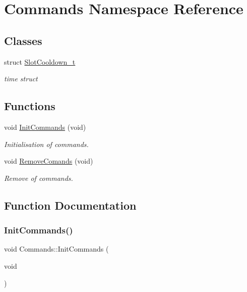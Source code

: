 \hypertarget{namespace_commands}{}\section{Commands Namespace Reference}
\label{namespace_commands}
\subsection*{Classes}
\begin{DoxyCompactItemize}
\item 
struct \mbox{\hyperlink{struct_commands_1_1_slot_cooldown__t}{Slot\+Cooldown\+\_\+t}}
\begin{DoxyCompactList}\small\item\em time struct \end{DoxyCompactList}\end{DoxyCompactItemize}
\subsection*{Functions}
\begin{DoxyCompactItemize}
\item 
void \mbox{\hyperlink{namespace_commands_a51cb85ec2c0f776aa53dcb6c8c2c7cd3}{Init\+Commands}} (void)
\begin{DoxyCompactList}\small\item\em Initialisation of commands. \end{DoxyCompactList}\item 
void \mbox{\hyperlink{namespace_commands_ae6511be8bafb608ff2b1861a98e3e4e6}{Remove\+Comands}} (void)
\begin{DoxyCompactList}\small\item\em Remove of commands. \end{DoxyCompactList}\end{DoxyCompactItemize}


\subsection{Function Documentation}
\mbox{\label{namespace_commands_a51cb85ec2c0f776aa53dcb6c8c2c7cd3}} 
\subsubsection{\texorpdfstring{Init\+Commands()}{InitCommands()}}
{\footnotesize\ttfamily void Commands\+::\+Init\+Commands (\begin{DoxyParamCaption}\item[{void}]{ }\end{DoxyParamCaption})}



